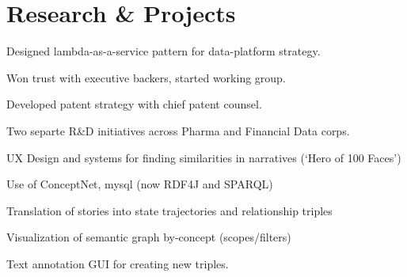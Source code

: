 \documentclass[letterpaper]{deedy-resume} %
\begin{document}
\begin{minipage}[t]{0.66\textwidth} %


\section{Research \& Projects}



\vspace{\topsep} %
\begin{tightitemize}
\item Designed lambda-as-a-service pattern for data-platform strategy.
\item Won trust with executive backers, started working group.
\item Developed patent strategy with chief patent counsel.
\item Two separte R\&D initiatives across Pharma and Financial Data corps.
\end{tightitemize}

\sectionspace %




UX Design and systems for finding similarities in narratives (‘Hero of 100 Faces’)
\begin{tightitemize}
\item Use of ConceptNet, mysql (now RDF4J and SPARQL)
\item Translation of stories into state trajectories and relationship triples
\item Visualization of semantic graph by-concept (scopes/filters)
\item Text annotation GUI for creating new triples.
\end{tightitemize}

\sectionspace %





\end{minipage}
\end{document}
